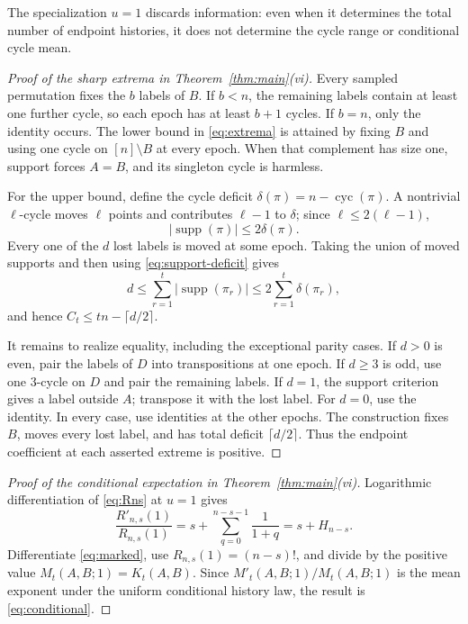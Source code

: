 \documentclass[a4paper,10pt]{amsart}
\theoremstyle{remark}
\newcommand{\cyc}{\operatorname{cyc}}
\newcommand{\supp}{\operatorname{supp}}
\begin{document}
The specialization $u=1$ discards information: even when it determines the
total number of endpoint histories, it does not determine the cycle range or
conditional cycle mean.

\begin{proof}[Proof of the sharp extrema in Theorem~\ref{thm:main}(vi)]
Every sampled permutation fixes the $b$ labels of $B$.  If $b<n$, the
remaining labels contain at least one further cycle, so each epoch has at
least $b+1$ cycles.  If $b=n$, only the identity occurs.  The lower bound in
\eqref{eq:extrema} is attained by fixing $B$ and using one cycle on
$[n]\setminus B$ at every epoch.  When that complement has size one, support
forces $A=B$, and its singleton cycle is harmless.

For the upper bound, define the cycle deficit
$\delta(\pi)=n-\cyc(\pi)$.  A nontrivial $\ell$-cycle moves $\ell$ points
and contributes $\ell-1$ to $\delta$; since
$\ell\le2(\ell-1)$,
\begin{equation}\label{eq:support-deficit}
 |\supp(\pi)|\le2\delta(\pi).
\end{equation}
Every one of the $d$ lost labels is moved at some epoch.  Taking the union of
moved supports and then using \eqref{eq:support-deficit} gives
\[
 d\le\sum_{r=1}^t|\supp(\pi_r)|
   \le2\sum_{r=1}^t\delta(\pi_r),
\]
and hence $C_t\le tn-\lceil d/2\rceil$.

It remains to realize equality, including the exceptional parity cases.
If $d>0$ is even, pair the labels of $D$ into transpositions at one epoch.
If $d\ge3$ is odd, use one $3$-cycle on $D$ and pair the remaining labels.
If $d=1$, the support criterion gives a label outside $A$; transpose it with
the lost label.  For $d=0$, use the identity.  In every case, use identities
at the other epochs.  The construction fixes $B$, moves every lost label,
and has total deficit $\lceil d/2\rceil$.  Thus the endpoint coefficient at
each asserted extreme is positive.
\end{proof}

\begin{proof}[Proof of the conditional expectation in
Theorem~\ref{thm:main}(vi)]
Logarithmic differentiation of \eqref{eq:Rns} at $u=1$ gives
\[
 \frac{R'_{n,s}(1)}{R_{n,s}(1)}
 =s+\sum_{q=0}^{n-s-1}\frac1{1+q}=s+H_{n-s}.
\]
Differentiate \eqref{eq:marked}, use $R_{n,s}(1)=(n-s)!$, and divide by the
positive value $M_t(A,B;1)=K_t(A,B)$.  Since
$M'_t(A,B;1)/M_t(A,B;1)$ is the mean exponent under the uniform conditional
history law, the result is \eqref{eq:conditional}.
\end{proof}
\end{document}
